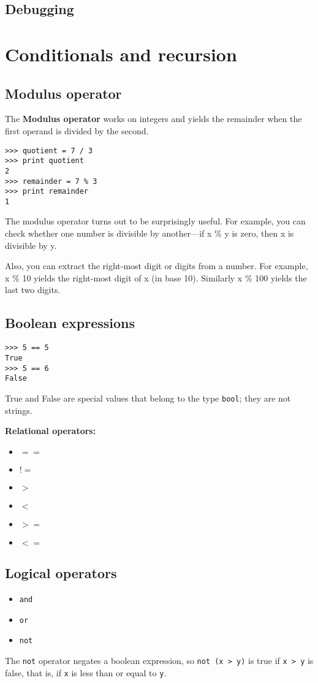 \documentclass{article}
\begin{document}
\subsection{Debugging}

\section{Conditionals and recursion}
\subsection{Modulus operator}
The \textbf{Modulus operator} works on integers and yields the remainder
when the first operand is divided by the second.
\begin{verbatim}
>>> quotient = 7 / 3
>>> print quotient
2
>>> remainder = 7 % 3
>>> print remainder
1
\end{verbatim}
The modulus operator turns out to be surprisingly useful. For example,
you can check whether one number is divisible by another—if x \% y is
zero, then x is divisible by y.

Also, you can extract the right-most digit or digits from a number.
For example, x \% 10 yields the right-most digit of x (in base 10).
Similarly x \% 100 yields the last two digits.
\subsection{Boolean expressions}
\begin{verbatim}
>>> 5 == 5
True
>>> 5 == 6
False
\end{verbatim}
True and False are special values that belong to the type
\verb|bool|; they are not strings.

\textbf{Relational operators:}
\begin{itemize}
    \item $==$
    \item $!=$
    \item $>$
    \item $<$
    \item $>=$
    \item $<=$
\end{itemize}
\subsection{Logical operators}
\begin{itemize}
    \item \verb|and|
    \item \verb|or|
    \item \verb|not|
\end{itemize}
The \verb|not| operator negates a boolean expression, so
\verb|not (x > y)| is true if \verb|x > y| is false, that is, if
\verb|x| is less than or equal to \verb|y|.
\end{document}
